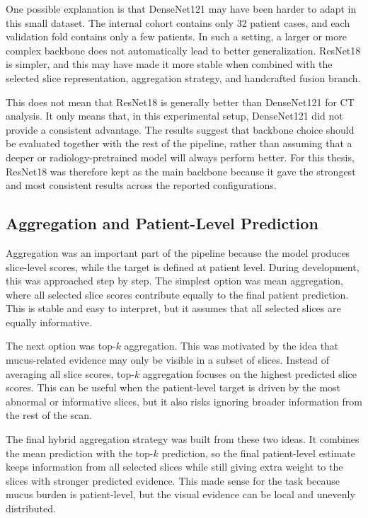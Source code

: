 One possible explanation is that DenseNet121 may have been harder to adapt in this small dataset. The internal cohort contains only 32 patient cases, and each validation fold contains only a few patients. In such a setting, a larger or more complex backbone does not automatically lead to better generalization. ResNet18 is simpler, and this may have made it more stable when combined with the selected slice representation, aggregation strategy, and handcrafted fusion branch.

This does not mean that ResNet18 is generally better than DenseNet121 for CT analysis. It only means that, in this experimental setup, DenseNet121 did not provide a consistent advantage. The results suggest that backbone choice should be evaluated together with the rest of the pipeline, rather than assuming that a deeper or radiology-pretrained model will always perform better. For this thesis, ResNet18 was therefore kept as the main backbone because it gave the strongest and most consistent results across the reported configurations.


\subsection{Aggregation and Patient-Level Prediction}
Aggregation was an important part of the pipeline because the model produces slice-level scores, while the target is defined at patient level. During development, this was approached step by step. The simplest option was mean aggregation, where all selected slice scores contribute equally to the final patient prediction. This is stable and easy to interpret, but it assumes that all selected slices are equally informative.

The next option was top-\(k\) aggregation. This was motivated by the idea that mucus-related evidence may only be visible in a subset of slices. Instead of averaging all slice scores, top-\(k\) aggregation focuses on the highest predicted slice scores. This can be useful when the patient-level target is driven by the most abnormal or informative slices, but it also risks ignoring broader information from the rest of the scan.

The final hybrid aggregation strategy was built from these two ideas. It combines the mean prediction with the top-\(k\) prediction, so the final patient-level estimate keeps information from all selected slices while still giving extra weight to the slices with stronger predicted evidence. This made sense for the task because mucus burden is patient-level, but the visual evidence can be local and unevenly distributed.

